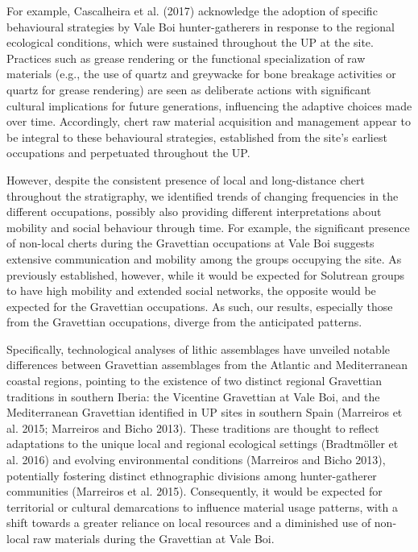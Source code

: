 \documentclass[
  a4paper,
  DIV=11,
  numbers=noendperiod]{scrreprt}
\begin{document}
For example, Cascalheira et al. (2017) acknowledge the adoption of
specific behavioural strategies by Vale Boi hunter-gatherers in response
to the regional ecological conditions, which were sustained throughout
the UP at the site. Practices such as grease rendering or the functional
specialization of raw materials (e.g., the use of quartz and greywacke
for bone breakage activities or quartz for grease rendering) are seen as
deliberate actions with significant cultural implications for future
generations, influencing the adaptive choices made over time.
Accordingly, chert raw material acquisition and management appear to be
integral to these behavioural strategies, established from the site's
earliest occupations and perpetuated throughout the UP.

However, despite the consistent presence of local and long-distance
chert throughout the stratigraphy, we identified trends of changing
frequencies in the different occupations, possibly also providing
different interpretations about mobility and social behaviour through
time. For example, the significant presence of non-local cherts during
the Gravettian occupations at Vale Boi suggests extensive communication
and mobility among the groups occupying the site. As previously
established, however, while it would be expected for Solutrean groups to
have high mobility and extended social networks, the opposite would be
expected for the Gravettian occupations. As such, our results,
especially those from the Gravettian occupations, diverge from the
anticipated patterns.

Specifically, technological analyses of lithic assemblages have unveiled
notable differences between Gravettian assemblages from the Atlantic and
Mediterranean coastal regions, pointing to the existence of two distinct
regional Gravettian traditions in southern Iberia: the Vicentine
Gravettian at Vale Boi, and the Mediterranean Gravettian identified in
UP sites in southern Spain (Marreiros et al. 2015; Marreiros and Bicho
2013). These traditions are thought to reflect adaptations to the unique
local and regional ecological settings (Bradtmöller et al. 2016) and
evolving environmental conditions (Marreiros and Bicho 2013),
potentially fostering distinct ethnographic divisions among
hunter-gatherer communities (Marreiros et al. 2015). Consequently, it
would be expected for territorial or cultural demarcations to influence
material usage patterns, with a shift towards a greater reliance on
local resources and a diminished use of non-local raw materials during
the Gravettian at Vale Boi.
\end{document}
